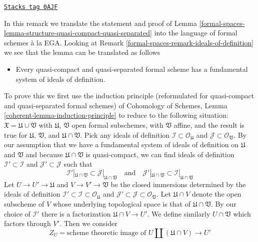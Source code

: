\begin{remark}
\label{formal-spaces-remark-structure-quasi-compact-quasi-separated}
\href{https://stacks.math.columbia.edu/tag/0AJF}{\texttt{Stacks tag 0AJF}}

In this remark we translate the statement and proof of
Lemma \ref{formal-spaces-lemma-structure-quasi-compact-quasi-separated}
into the language of formal schemes \`a la EGA.
Looking at Remark \ref{formal-spaces-remark-ideals-of-definition} we see
that the lemma can be translated as follows
\begin{itemize}
\item[(*)] Every quasi-compact and quasi-separated formal
scheme has a fundamental system of ideals of definition.
\end{itemize}
To prove this we first use the induction principle (reformulated for
quasi-compact and quasi-separated formal schemes) of
Cohomology of Schemes, Lemma \ref{coherent-lemma-induction-principle}
to reduce to the following situation:
$\mathfrak X = \mathfrak U \cup \mathfrak V$
with $\mathfrak U$, $\mathfrak V$ open formal subschemes,
with $\mathfrak V$ affine, and the result is true for $\mathfrak U$,
$\mathfrak V$, and $\mathfrak U \cap \mathfrak V$. Pick any ideals
of definition $\mathcal{I} \subset \mathcal{O}_\mathfrak U$
and $\mathcal{J} \subset \mathcal{O}_\mathfrak V$.
By our assumption that we have a fundamental system of ideals
of definition on $\mathfrak U$ and $\mathfrak V$ and because
$\mathfrak U \cap \mathfrak V$ is quasi-compact, we can find
ideals of definition $\mathcal{I}' \subset \mathcal{I}$
and $\mathcal{J}' \subset \mathcal{J}$
such that
$$
\mathcal{I}'|_{\mathfrak U \cap \mathfrak V} \subset
\mathcal{J}|_{\mathfrak U \cap \mathfrak V}
\quad\text{and}\quad
\mathcal{J}'|_{\mathfrak U \cap \mathfrak V} \subset
\mathcal{I}|_{\mathfrak U \cap \mathfrak V}
$$
Let $U \to U' \to \mathfrak U$ and $V \to V' \to \mathfrak V$ be the
closed immersions determined by the ideals of definition
$\mathcal{I}' \subset \mathcal{I} \subset \mathcal{O}_\mathfrak U$
and
$\mathcal{J}' \subset \mathcal{J} \subset \mathcal{O}_\mathfrak V$.
Let $\mathfrak U \cap V$ denote the open subscheme of $V$ whose
underlying topological space is that of $\mathfrak U \cap \mathfrak V$.
By our choice of $\mathcal{I}'$ there is a factorization
$\mathfrak U \cap V \to U'$.
We define similarly $U \cap \mathfrak V$ which factors through $V'$.
Then we consider
$$
Z_U = \text{scheme theoretic image of }
U \amalg (\mathfrak U \cap V) \longrightarrow U'
$$
\end{remark}
